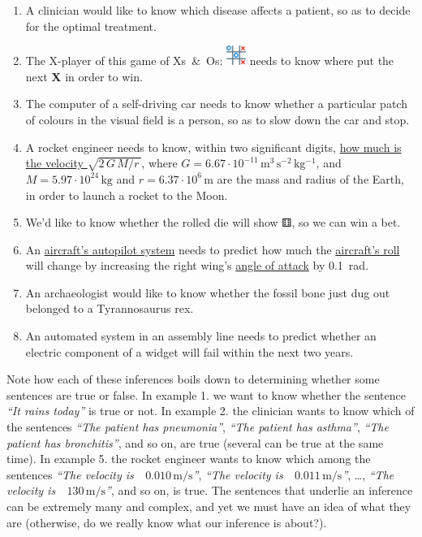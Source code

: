 \documentclass[
  letterpaper,
  DIV=11,
  numbers=noendperiod,
  oneside]{scrreprt}
\begin{document}
\begin{enumerate}
\def\labelenumi{\arabic{enumi}.}
\setcounter{enumi}{1}
\item
  A clinician would like to know which disease affects a patient, so as
  to decide for the optimal treatment.
\item
  The X-player of this game of Xs~\&~Os:
  \includegraphics[width=0.05\textwidth,height=\textheight]{XsOs.png}
  needs to know where put the next {\textbf{X}} in order to win.
\item
  The computer of a self-driving car needs to know whether a particular
  patch of colours in the visual field is a person, so as to slow down
  the car and stop.
\item
  A rocket engineer needs to know, within two significant digits,
  \href{http://nasaphysics.cet.edu/escape-velocity.html}{how much is the
  velocity \(\sqrt{2\,G\,M/r\,}\)}, where
  \(G=6.67 \cdot 10^{-11}\,\mathrm{m^3\,s^{-2}\,kg^{-1}}\), and
  \(M = 5.97 \cdot 10^{24}\,\mathrm{kg}\) and
  \(r = 6.37 \cdot 10^{6}\,\mathrm{m}\) are the mass and radius of the
  Earth, in order to launch a rocket to the Moon.
\item
  We'd like to know whether the rolled die will show ⚅, so we can win a
  bet.
\item
  An
  \href{https://aerospaceamerica.aiaa.org/features/a-i-in-the-cockpit}{aircraft's
  autopilot system} needs to predict how much the
  \href{https://www.grc.nasa.gov/www/k-12/VirtualAero/BottleRocket/airplane/roll.html}{aircraft's
  roll} will change by increasing the right wing's
  \href{https://www.grc.nasa.gov/www/k-12/VirtualAero/BottleRocket/airplane/incline.html}{angle
  of attack} by 0.1~rad.
\item
  An archaeologist would like to know whether the fossil bone just dug
  out belonged to a Tyrannosaurus rex.
\item
  An automated system in an assembly line needs to predict whether an
  electric component of a widget will fail within the next two years.
\end{enumerate}

Note how each of these inferences boils down to determining whether some
sentences are true or false. In example 1. we want to know whether the
sentence \emph{``It rains today''} is true or not. In example 2. the
clinician wants to know which of the sentences \emph{``The patient has
pneumonia''}, \emph{``The patient has asthma''}, \emph{``The patient has
bronchitis''}, and so on, are true (several can be true at the same
time). In example 5. the rocket engineer wants to know which among the
sentences \emph{``The velocity is~~\(0.010\,\mathrm{m/s}\)''},
\emph{``The velocity is~~\(0.011\,\mathrm{m/s}\)''}, \ldots, \emph{``The
velocity is~~\(130\,\mathrm{m/s}\)''}, and so on, is true. The sentences
that underlie an inference can be extremely many and complex, and yet we
must have an idea of what they are (otherwise, do we really know what
our inference is about?).
\end{document}
